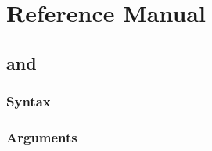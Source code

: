 \documentclass[]{jss}
\begin{document}
\hypertarget{reference-manual}{%
\section{Reference Manual}\label{reference-manual}}

\subsection[lmtp_tmle and lmtp_sdr]{ and }

\subsubsection{Syntax}

\subsubsection{Arguments}
\end{document}
